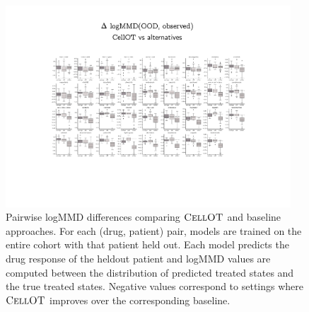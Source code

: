 \begin{figure}[h]
  \begin{center}
    \includegraphics[width=0.95\textwidth]{figures/cellot-cohort/ood-eval-logmmd.pdf}
  \end{center}
  \caption{
    Pairwise logMMD differences comparing $\textsc{CellOT}$ and baseline approaches.
    For each (drug, patient) pair, models are trained on the entire cohort with that patient held out.
    Each model predicts the drug response of the heldout patient
    and logMMD values are computed between the distribution of predicted treated states and the true treated states.
    Negative values correspond to settings where $\textsc{CellOT}$ improves over the corresponding baseline.
  }
\label{fig:ood-eval-logmmd}
\end{figure}

